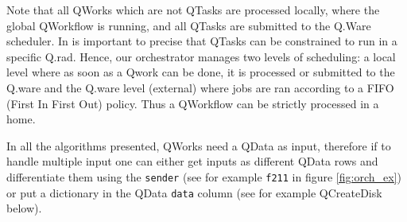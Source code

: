 \documentclass[10pt, conference, compsocconf]{IEEEtran}
\begin{document}
Note that all QWorks which are not QTasks are processed locally, where the global QWorkflow is running, and all QTasks are submitted to the Q.Ware scheduler. In is important to precise that QTasks can be constrained to run in a specific Q.rad. Hence, our orchestrator manages two levels of scheduling: a local level where as soon as a Qwork can be done, it is processed or submitted to the Q.ware and the Q.ware level (external) where jobs are ran according to a FIFO (First In First Out) policy. Thus a QWorkflow can be strictly processed in a home.

In all the algorithms presented, QWorks need a QData as input, therefore if to handle multiple input one can either get inputs as different QData rows and differentiate them using the \texttt{sender} (see for example \texttt{f211} in figure \ref{fig:orch_ex}) or put a dictionary in the QData \texttt{data} column (see for example QCreateDisk below).
\end{document}
